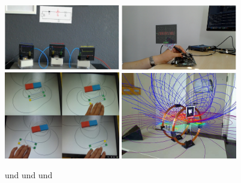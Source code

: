 \begin{figure}[h!]
	\centering
	\includegraphics[width=0.45\textwidth]{images/Amiraslanov18.png}
	\hspace{0.05cm}
	\includegraphics[width=0.45\textwidth]{images/Javaheri18.png}
	\vspace{0.05cm}
	\includegraphics[width=0.45\textwidth]{images/Matsutomo13.jpg}
	\hspace{0.05cm}
	\includegraphics[width=0.45\textwidth]{images/Buchau09.jpg}
	\caption{\cite{Amiraslanov18} und \cite{Javaheri18} und \cite{Matsutomo13} und \cite{Buchau09}}
	\label{img:paper-collection}
\end{figure}

